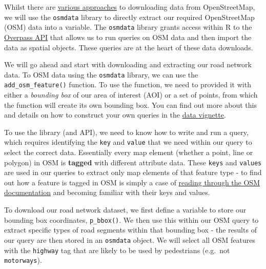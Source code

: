 \documentclass[
  letterpaper,
  DIV=11,
  numbers=noendperiod]{scrreprt}
\begin{document}
Whilst there are
\href{https://wiki.openstreetmap.org/wiki/Downloading_data}{various
approaches} to downloading data from OpenStreetMap, we will use the
\texttt{osmdata} library to directly extract our required OpenStreetMap
(OSM) data into a variable. The \texttt{osmdata} library grants access
within R to the \href{https://overpass-turbo.eu/}{Overpass API} that
allows us to run queries on OSM data and then import the data as spatial
objects. These queries are at the heart of these data downloads.

We will go ahead and start with downloading and extracting our road
network data. To OSM data using the \texttt{osmdata} library, we can use
the \texttt{add\_osm\_feature()} function. To use the function, we need
to provided it with either a \emph{bounding box} of our area of interest
(AOI) or a set of points, from which the function will create its own
bounding box. You can find out more about this and details on how to
construct your own queries in the
\href{https://cran.r-project.org/web/packages/osmdata/vignettes/osmdata.html}{data
vignette}.

To use the library (and API), we need to know how to write and run a
query, which requires identifying the \texttt{key} and \texttt{value}
that we need within our query to select the correct data. Essentially
every map element (whether a point, line or polygon) in OSM is
\textbf{tagged} with different attribute data. These \texttt{keys} and
\texttt{values} are used in our queries to extract only map elements of
that feature type - to find out how a feature is tagged in OSM is simply
a case of \href{https://wiki.openstreetmap.org/wiki/Tags}{reading
through the OSM documentation} and becoming familiar with their keys and
values.

To download our road network dataset, we first define a variable to
store our bounding box coordinates, \texttt{p\_bbox()}. We then use this
within our OSM query to extract specific types of road segments within
that bounding box - the results of our query are then stored in an
\texttt{osmdata} object. We will select all OSM features with the
\texttt{highway} tag that are likely to be used by pedestrians (e.g.~not
\texttt{motorways}).
\end{document}
